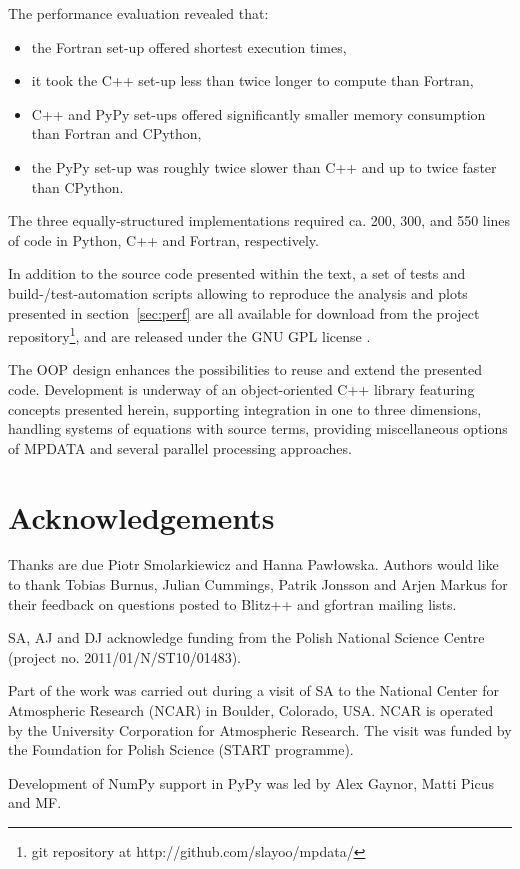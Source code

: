 \documentclass[final,5p,times,twocolumn]{elsarticle}
\newcommand{\url}[1]{{#1}}
\begin{document}
  The performance evaluation revealed that:
    \begin{itemize}
      \item{the Fortran set-up offered shortest execution times,}
      \item{it took the C++ set-up less than twice longer to compute than Fortran,}
      \item{C++ and PyPy set-ups offered significantly smaller memory consumption 
        than Fortran and CPython,}
      \item{the PyPy set-up was roughly twice slower than C++ and up to twice faster than CPython.}
    \end{itemize}
  The three equally-structured implementations required ca. 200, 300, and 550 lines of code
    in Python, C++ and Fortran, respectively.  

  In addition to the source code presented within the text,
    a set of tests and build-/test-automation scripts
    allowing to reproduce the analysis and plots presented in section~\ref{sec:perf} are all 
    available for download from the project repository\footnote{git repository at \url{http://github.com/slayoo/mpdata/}},
    and are released under the GNU GPL license \citep{GPLv3}.

  The OOP design enhances the possibilities to reuse and extend the presented code.
  Development is underway of an object-oriented C++ library featuring concepts presented herein,
    supporting integration in one to three dimensions, handling systems of equations with source terms, 
    providing miscellaneous options of MPDATA and several parallel processing approaches.

  \section*{Acknowledgements}
  {\small
    \noindent 
    Thanks are due Piotr Smolarkiewicz and Hanna Pawłowska.
    \noindent
    Authors would like to thank Tobias Burnus, Julian Cummings, Patrik Jonsson and
      Arjen Markus for their feedback on questions posted to Blitz++ and gfortran
      mailing lists.
    
    \noindent
    SA, AJ and DJ acknowledge funding from the Polish National Science Centre
      (project no. 2011/01/N/ST10/01483).

    \noindent
    Part of the work was carried out during a visit of SA to the National
      Center for Atmospheric Research (NCAR) in Boulder, Colorado, USA.
    NCAR is operated by the University Corporation for Atmospheric Research.
    The visit was funded by the Foundation for Polish Science (START programme).
 
    \noindent
    Development of NumPy support in PyPy was led by Alex Gaynor, Matti Picus and MF.
  }
\end{document}

